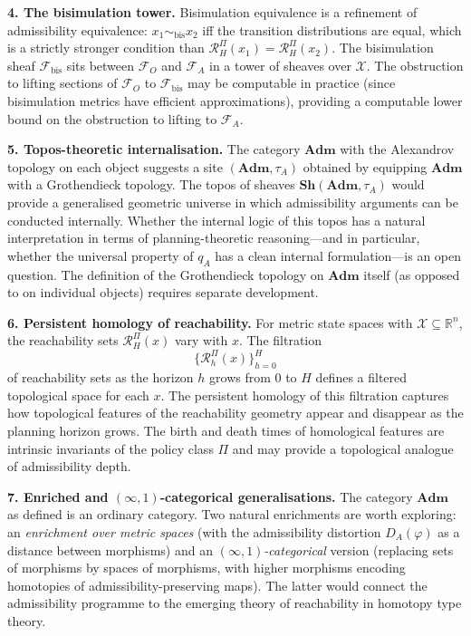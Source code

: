 \documentclass[11pt, a4paper]{article}
\theoremstyle{plain}
\theoremstyle{definition}
\theoremstyle{remark}
\newcommand{\R}{\mathbb{R}}
\newcommand{\calX}{\mathcal{X}}
\newcommand{\calF}{\mathcal{F}}
\newcommand{\RHP}{\mathcal{R}_{H}^{\Pi}}
\newcommand{\DA}{D_{A}(\varphi)}
\newcommand{\Adm}{\mathbf{Adm}}
\begin{document}
\medskip
\noindent\textbf{4. The bisimulation tower.} Bisimulation equivalence is a
refinement of admissibility equivalence: $x_1 \sim_\mathrm{bis} x_2$ iff
the transition distributions are equal, which is a strictly stronger condition
than $\RHP(x_1) = \RHP(x_2)$. The bisimulation sheaf $\calF_\mathrm{bis}$
sits between $\calF_O$ and $\calF_A$ in a tower of sheaves over $\calX$.
The obstruction to lifting sections of $\calF_O$ to $\calF_\mathrm{bis}$ may
be computable in practice (since bisimulation metrics have efficient
approximations), providing a computable lower bound on the obstruction to
lifting to $\calF_A$.

\medskip
\noindent\textbf{5. Topos-theoretic internalisation.} The category $\Adm$
with the Alexandrov topology on each object suggests a site $(\Adm, \tau_A)$
obtained by equipping $\Adm$ with a Grothendieck topology. The topos of
sheaves $\mathbf{Sh}(\Adm, \tau_A)$ would provide a generalised geometric
universe in which admissibility arguments can be conducted internally. Whether
the internal logic of this topos has a natural interpretation in terms of
planning-theoretic reasoning---and in particular, whether the universal
property of $q_A$ has a clean internal formulation---is an open question. The
definition of the Grothendieck topology on $\Adm$ itself (as opposed to on
individual objects) requires separate development.

\medskip
\noindent\textbf{6. Persistent homology of reachability.} For metric state
spaces with $\calX \subseteq \R^n$, the reachability sets $\RHP(x)$ vary
with $x$. The filtration
\[
  \bigl\{\mathcal{R}_h^\Pi(x)\bigr\}_{h = 0}^{H}
\]
of reachability sets as the horizon $h$ grows from $0$ to $H$ defines a
filtered topological space for each $x$. The persistent homology of this
filtration captures how topological features of the reachability geometry
appear and disappear as the planning horizon grows. The birth and death times
of homological features are intrinsic invariants of the policy class $\Pi$
and may provide a topological analogue of admissibility depth.

\medskip
\noindent\textbf{7. Enriched and $(\infty,1)$-categorical generalisations.}
The category $\Adm$ as defined is an ordinary category. Two natural enrichments
are worth exploring: an \emph{enrichment over metric spaces} (with the
admissibility distortion $\DA$ as a distance between morphisms) and an
\emph{$(\infty,1)$-categorical} version (replacing sets of morphisms by
spaces of morphisms, with higher morphisms encoding homotopies of
admissibility-preserving maps). The latter would connect the admissibility
programme to the emerging theory of reachability in homotopy type theory.
\end{document}
